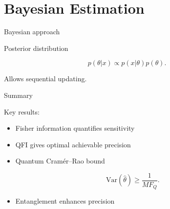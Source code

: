 \documentclass[aspectratio=169]{beamer}
\begin{document}
\section{Bayesian Estimation}

\begin{frame}{Bayesian approach}

Posterior distribution

\begin{equation}
p(\theta|x)
\propto
p(x|\theta)p(\theta).
\end{equation}

Allows sequential updating.
\end{frame}

\begin{frame}{Summary}

Key results:

\begin{itemize}
\item Fisher information quantifies sensitivity
\item QFI gives optimal achievable precision
\item Quantum Cramér–Rao bound

\begin{equation}
\mathrm{Var}(\hat{\theta})
\ge
\frac{1}{M F_Q}.
\end{equation}

\item Entanglement enhances precision
\end{itemize}

\end{frame}
\end{document}
